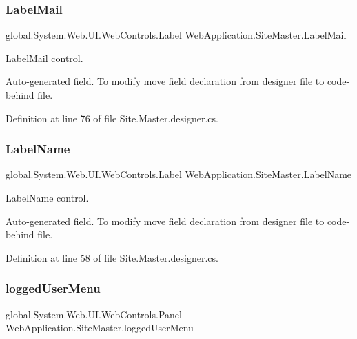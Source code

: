 \subsubsection{\texorpdfstring{LabelMail}{LabelMail}}
{\footnotesize\ttfamily global.\+System.\+Web.\+U\+I.\+Web\+Controls.\+Label Web\+Application.\+Site\+Master.\+Label\+Mail\hspace{0.3cm}{\ttfamily [protected]}}



Label\+Mail control. 

Auto-\/generated field. To modify move field declaration from designer file to code-\/behind file. 

Definition at line 76 of file Site.\+Master.\+designer.\+cs.

\mbox{\label{classWebApplication_1_1SiteMaster_add9db19501eab2adeff5c50cb5736bb5}} 
\subsubsection{\texorpdfstring{LabelName}{LabelName}}
{\footnotesize\ttfamily global.\+System.\+Web.\+U\+I.\+Web\+Controls.\+Label Web\+Application.\+Site\+Master.\+Label\+Name\hspace{0.3cm}{\ttfamily [protected]}}



Label\+Name control. 

Auto-\/generated field. To modify move field declaration from designer file to code-\/behind file. 

Definition at line 58 of file Site.\+Master.\+designer.\+cs.

\mbox{\label{classWebApplication_1_1SiteMaster_a2c15591013d1e6ae617573ae910128f6}} 
\subsubsection{\texorpdfstring{loggedUserMenu}{loggedUserMenu}}
{\footnotesize\ttfamily global.\+System.\+Web.\+U\+I.\+Web\+Controls.\+Panel Web\+Application.\+Site\+Master.\+logged\+User\+Menu\hspace{0.3cm}{\ttfamily [protected]}}



